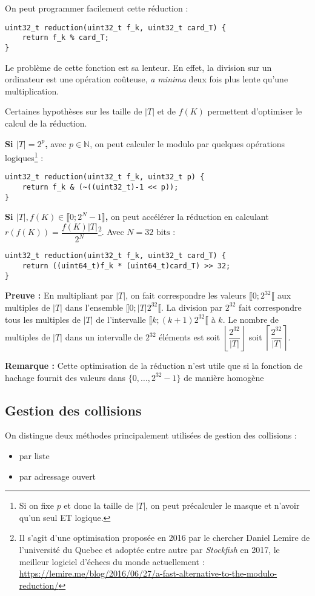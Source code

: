 \documentclass[../../../main.tex]{subfiles}
\begin{document}
On peut programmer facilement cette réduction :
\begin{verbatim}
uint32_t reduction(uint32_t f_k, uint32_t card_T) {
	return f_k % card_T;
}
\end{verbatim}
Le problème de cette fonction est sa lenteur. En effet, la division sur un ordinateur est une opération coûteuse, \textit{a minima} deux fois plus lente qu'une multiplication.

Certaines hypothèses sur les taille de $|T|$ et de $f(K)$ permettent d'optimiser le calcul de la réduction. 

\textbf{Si $|T| = 2^p$,} avec $p\in\mathbb{N}$, on peut calculer le modulo par quelques opérations logiques\footnote{Si on fixe $p$ et donc la taille de $|T|$, on peut précalculer le masque et n'avoir qu'un seul ET logique.} :
\begin{verbatim}
uint32_t reduction(uint32_t f_k, uint32_t p) {
	return f_k & (~((uint32_t)-1 << p));
}
\end{verbatim}

\textbf{Si $|T|, f(K)\in\llbracket 0; 2^N - 1\rrbracket$,} on peut accélérer la réduction en calculant $r(f(K)) = \dfrac{f(K)|T|}{2^N}$\footnote{Il s'agit d'une optimisation proposée en 2016 par le chercher Daniel Lemire de l'université du Quebec et adoptée entre autre par \textit{Stockfish} en 2017, le meilleur logiciel d'échecs du monde actuellement : \url{https://lemire.me/blog/2016/06/27/a-fast-alternative-to-the-modulo-reduction/}}. Avec $N = 32\text{ bits}$ :
\begin{verbatim}
uint32_t reduction(uint32_t f_k, uint32_t card_T) {
	return ((uint64_t)f_k * (uint64_t)card_T) >> 32;
}
\end{verbatim}
\textbf{Preuve :} En multipliant par $|T|$, on fait correspondre les valeurs $\llbracket 0; 2^{32}\llbracket$ aux multiples de $|T|$ dans l'ensemble $\llbracket 0; |T|2^{32}\llbracket$. La division par $2^{32}$ fait correspondre tous les multiples de $|T|$ de l'intervalle $\llbracket k; (k+1)2^{32}\llbracket$ à $k$. Le nombre de multiples de $|T|$ dans un intervalle de $2^{32}$ éléments est soit $\left\lfloor \dfrac{2^{32}}{|T|}\right\rfloor$ soit $\left\lceil \dfrac{2^{32}}{|T|}\right\rceil$.

\textbf{Remarque :} Cette optimisation de la réduction n'est utile que si la fonction de hachage fournit des valeurs dans $\{0, \dots, 2^{32}-1\}$ de manière homogène
\subsection{Gestion des collisions}
On distingue deux méthodes principalement utilisées de gestion des collisions :
\begin{itemize}
	\item par liste
	\item par adressage ouvert
\end{itemize}
\end{document}
